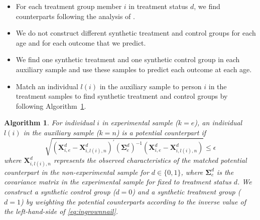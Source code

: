\documentclass[static]{JJH-Beamer}
\newtheorem{algorithm}{Algorithm}
\begin{document}
\begin{frame}
 \addtocounter{framenumber}{-1}

\begin{itemize}
\item For each treatment group member $i$ in treatment status $d$, we find counterparts following the analysis of \citet{Heckman_Ichimura_etal_1998_REStud}.
\item We do not construct different synthetic treatment and control groups for each age and for each outcome that we predict.
\item We find one synthetic treatment and one synthetic control group in each auxiliary sample and use these samples to predict each outcome at each age.
\item Match an individual $l(i)$ in the auxiliary sample to person $i$ in the treatment samples to find synthetic treatment and control groups by following Algorithm~\ref{alg:match}.\\
\end{itemize}

\end{frame}

\begin{frame}
 \addtocounter{framenumber}{-1}

\begin{algorithm}\label{alg:match}
For individual $i$ in experimental sample ($k=e$), an individual $l(i)$ in the auxiliary sample ($k=n$) is a potential counterpart if
\begin{equation}\label{eq:ingrownnail}
\sqrt{(\bm{X}^d_{i,e} - \bm{X}^d_{i,l(i),n})^\prime (\bm{\Sigma}^d_e)^{-1} (\bm{X}^d_{i,e} - \bm{X}^d_{i,l(i),n})} \leq \epsilon
\end{equation}
where $\bm{X}^d_{i,l(i),n}$ represents the observed characteristics of the matched potential counterpart in the non-experimental sample for $d \in \{0,1\}$, where $\bm{\Sigma}^d_e$ is the covariance matrix in the experimental sample for fixed to treatment status $d$. We construct a synthetic control group ($d = 0$) and a synthetic treatment group ($d = 1$) by weighting the potential counterparts according to the inverse value of the left-hand-side of \eqref{eq:ingrownnail}.
\end{algorithm}

\end{frame}
\end{document}

